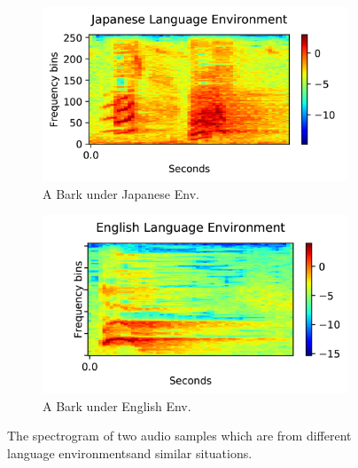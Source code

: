 \begin{figure}[th]
	\centering
\begin{subfigure}[t]{0.49\columnwidth}
        \centering
        \includegraphics[width=\textwidth]{dog_spec_ja_1.png}
        \caption{A Bark under Japanese Env.}
        \label{fig:subja}
\end{subfigure}
\begin{subfigure}[t]{0.49\columnwidth}
        \centering
        \includegraphics[width=\textwidth]{dog_spec_en_1.png}
        \caption{A Bark under English Env.}
        \label{fig:suben}
\end{subfigure}
	\caption{The spectrogram of two audio samples which are from different language environmentsand similar situations.}
	\label{Fig.sample}
\end{figure}

